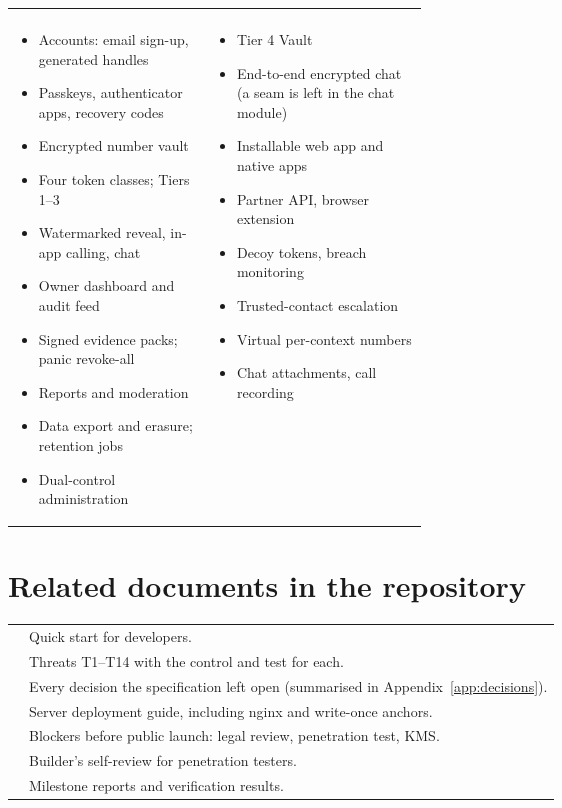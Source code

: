 \begin{tabularx}{\linewidth}{@{}L{0.48\linewidth}Y@{}}
 &  \\
\begin{itemize}
  \item Accounts: email sign-up, generated handles
  \item Passkeys, authenticator apps, recovery codes
  \item Encrypted number vault
  \item Four token classes; Tiers 1--3
  \item Watermarked reveal, in-app calling, chat
  \item Owner dashboard and audit feed
  \item Signed evidence packs; panic revoke-all
  \item Reports and moderation
  \item Data export and erasure; retention jobs
  \item Dual-control administration
\end{itemize}
&
\begin{itemize}
  \item Tier 4 Vault
  \item End-to-end encrypted chat (a seam is left in the chat module)
  \item Installable web app and native apps
  \item Partner API, browser extension
  \item Decoy tokens, breach monitoring
  \item Trusted-contact escalation
  \item Virtual per-context numbers
  \item Chat attachments, call recording
\end{itemize}
\end{tabularx}

\section{Related documents in the repository}

\begin{tabularx}{\linewidth}{@{}L{4.6cm}Y@{}}
\toprule
{} & Quick start for developers. \\
 & Threats T1--T14 with the control and test for each. \\
 & Every decision the specification left open (summarised in Appendix~\ref{app:decisions}). \\
 & Server deployment guide, including nginx and write-once anchors. \\
 & Blockers before public launch: legal review, penetration test, KMS. \\
 & Builder's self-review for penetration testers. \\
 & Milestone reports and verification results. \\
\bottomrule
\end{tabularx}
